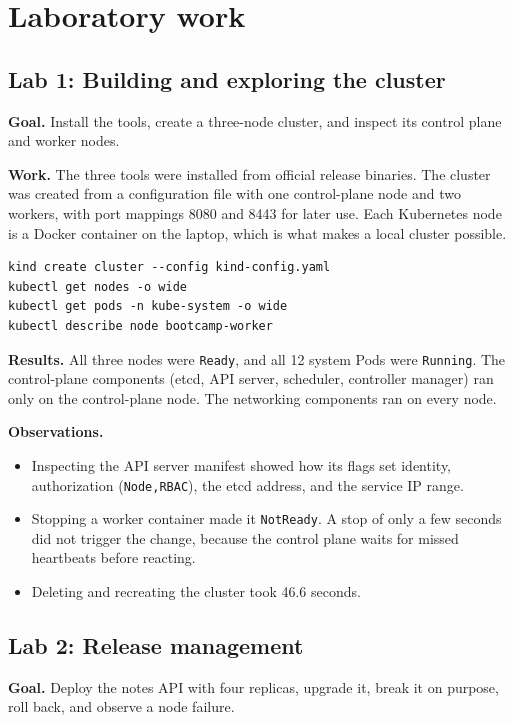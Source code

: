 \documentclass[11pt,a4paper]{article}
\begin{document}
\section{Laboratory work}

\subsection{Lab 1: Building and exploring the cluster}
\textbf{Goal.} Install the tools, create a three-node cluster, and inspect its control plane and worker nodes.

\textbf{Work.} The three tools were installed from official release binaries. The cluster was created from a configuration file with one control-plane node and two workers, with port mappings 8080 and 8443 for later use. Each Kubernetes node is a Docker container on the laptop, which is what makes a local cluster possible.

\begin{lstlisting}
kind create cluster --config kind-config.yaml
kubectl get nodes -o wide
kubectl get pods -n kube-system -o wide
kubectl describe node bootcamp-worker
\end{lstlisting}

\textbf{Results.} All three nodes were \texttt{Ready}, and all 12 system Pods were \texttt{Running}. The control-plane components (etcd, API server, scheduler, controller manager) ran only on the control-plane node. The networking components ran on every node.

\textbf{Observations.}
\begin{itemize}[leftmargin=*]
  \item Inspecting the API server manifest showed how its flags set identity, authorization (\texttt{Node,RBAC}), the etcd address, and the service IP range.
  \item Stopping a worker container made it \texttt{NotReady}. A stop of only a few seconds did not trigger the change, because the control plane waits for missed heartbeats before reacting.
  \item Deleting and recreating the cluster took 46.6 seconds.
\end{itemize}

\subsection{Lab 2: Release management}
\textbf{Goal.} Deploy the notes API with four replicas, upgrade it, break it on purpose, roll back, and observe a node failure.
\end{document}
